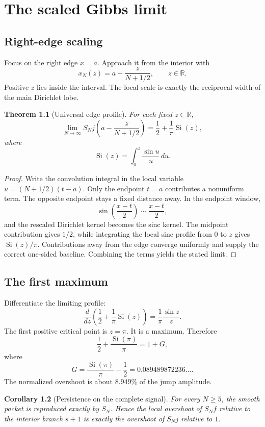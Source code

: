 \documentclass[11pt,oneside]{book}
\newtheorem{theorem}{Theorem}[chapter]
\newtheorem{corollary}[theorem]{Corollary}
\theoremstyle{remark}
\newcommand{\R}{\mathbb R}
\newcommand{\Si}{\operatorname{Si}}
\newcommand{\SN}{S_N}
\begin{document}
\chapter{The scaled Gibbs limit}

\section{Right-edge scaling}
Focus on the right edge $x=a$. Approach it from the interior with
\[
 x_N(z)=a-\frac{z}{N+1/2},
 \qquad z\in\R.
\]
Positive $z$ lies inside the interval. The local scale is exactly the reciprocal width of the main Dirichlet lobe.

\begin{theorem}[Universal edge profile]
For each fixed $z\in\R$,
\[
\boxed{
 \lim_{N\to\infty}\SN j\!\left(a-\frac{z}{N+1/2}\right)
 =\frac12+\frac1\pi\Si(z),}
\]
where
\[
 \Si(z)=\int_0^z\frac{\sin u}{u}\,du.
\]
\end{theorem}

\begin{proof}
Write the convolution integral in the local variable $u=(N+1/2)(t-a)$. Only the endpoint $t=a$ contributes a nonuniform term. The opposite endpoint stays a fixed distance away. In the endpoint window,
\[
 \sin\left(\frac{x-t}{2}\right)
 \sim \frac{x-t}{2},
\]
and the rescaled Dirichlet kernel becomes the sinc kernel. The midpoint contribution gives $1/2$, while integrating the local sinc profile from $0$ to $z$ gives $\Si(z)/\pi$. Contributions away from the edge converge uniformly and supply the correct one-sided baseline. Combining the terms yields the stated limit.
\end{proof}

\section{The first maximum}
Differentiate the limiting profile:
\[
 \frac{d}{dz}\left(\frac12+\frac1\pi\Si(z)\right)
 =\frac1\pi\frac{\sin z}{z}.
\]
The first positive critical point is $z=\pi$. It is a maximum. Therefore
\[
 \frac12+\frac{\Si(\pi)}{\pi}
 =1+G,
\]
where
\[
\boxed{
 G=\frac{\Si(\pi)}{\pi}-\frac12
 =0.089489872236\ldots.}
\]
The normalized overshoot is about $8.949\%$ of the jump amplitude.

\begin{corollary}[Persistence on the complete signal]
For every $N\ge5$, the smooth packet is reproduced exactly by $\SN$. Hence the local overshoot of $\SN f$ relative to the interior branch $s+1$ is exactly the overshoot of $\SN j$ relative to $1$.
\end{corollary}
\end{document}

